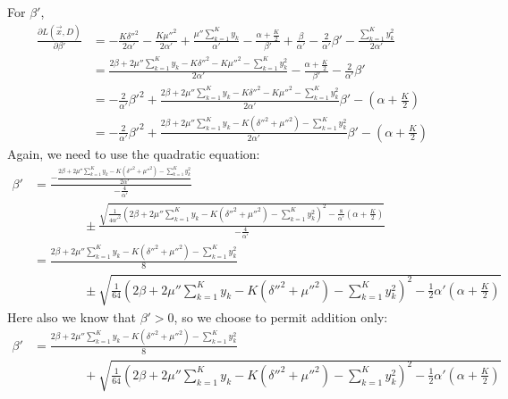 \documentclass[12pt]{article}
\begin{document}
\begin{appendices}
For $\beta'$,
\begin{align}
    \frac{\partial L(\vec{x}, D)}{\partial \beta'} &=
    - \frac{K\delta''^2}{2\alpha'} - \frac{K\mu''^2}{2\alpha'}
    + \frac{\mu''\sum_{k=1}^{K}y_{k}}{\alpha'}
    - \frac{\alpha + \frac{K}{2}}{\beta'}
    + \frac{\beta}{\alpha'} - \frac{2}{\alpha'}\beta'
    - \frac{\sum_{k=1}^{K} y_{k}^2}{2\alpha'}
    \nonumber \\
    &= \frac{2\beta + 2\mu''\sum_{k=1}^{K}y_{k}
    - K\delta''^2 - K\mu''^2
    - \sum_{k=1}^{K} y_{k}^2}{2\alpha'}
    - \frac{\alpha + \frac{K}{2}}{\beta'}
    - \frac{2}{\alpha'}\beta'
    \nonumber \\
    &=
    - \frac{2}{\alpha'}\beta'^2
    + \frac{2\beta + 2\mu''\sum_{k=1}^{K}y_{k}
    - K\delta''^2 - K\mu''^2
    - \sum_{k=1}^{K} y_{k}^2}{2\alpha'}\beta'
    - (\alpha + \frac{K}{2})
    \nonumber \\
    &=
    - \frac{2}{\alpha'}\beta'^2
    + \frac{2\beta + 2\mu''\sum_{k=1}^{K}y_{k}
    - K(\delta''^2 + \mu''^2)
    - \sum_{k=1}^{K} y_{k}^2}{2\alpha'}\beta'
    - (\alpha + \frac{K}{2})
    \nonumber
\end{align}
Again, we need to use the quadratic equation:
\begin{align}
    \beta' &= \frac{- \frac{2\beta + 2\mu''\sum_{k=1}^{K}y_{k} - K(\delta''^2 +
    \mu''^2) - \sum_{k=1}^{K} y_{k}^{2}}{2\alpha'}}{-\frac{4}{\alpha'}}
    \nonumber \\
    &\quad\quad\quad\quad
    \pm
    \frac{\sqrt{\frac{1}{4\alpha'^2}(2\beta + 2\mu''\sum_{k=1}^{K}y_{k} - K(\delta''^2 +
    \mu''^2) - \sum_{k=1}^{K} y_{k}^{2})^2 - \frac{8}{\alpha'}(\alpha +
    \frac{K}{2})}}
    {-\frac{4}{\alpha'}}
    \nonumber \\
    &= \frac{2\beta + 2\mu''\sum_{k=1}^{K}y_{k} - K(\delta''^2 +
    \mu''^2) - \sum_{k=1}^{K} y_{k}^{2}}{8}
    \nonumber \\
    &\quad\quad\quad\quad
    \pm
    \sqrt{\frac{1}{64}(2\beta + 2\mu''\sum_{k=1}^{K}y_{k} - K(\delta''^2 +
    \mu''^2) - \sum_{k=1}^{K} y_{k}^{2})^2 - \frac{1}{2}\alpha'(\alpha +
    \frac{K}{2})}
    \nonumber
\end{align}
Here also we know that $\beta' > 0$, so we choose to permit addition only:
\begin{align}
    \beta' &= \frac{2\beta + 2\mu''\sum_{k=1}^{K}y_{k} - K(\delta''^2 +
    \mu''^2) - \sum_{k=1}^{K} y_{k}^{2}}{8}
    \nonumber \\
    &\quad\quad\quad\quad
    +
    \sqrt{\frac{1}{64}(2\beta + 2\mu''\sum_{k=1}^{K}y_{k} - K(\delta''^2 +
    \mu''^2) - \sum_{k=1}^{K} y_{k}^{2})^2 - \frac{1}{2}\alpha'(\alpha +
    \frac{K}{2})}
    \nonumber
\end{align}
\end{appendices}
\fi

\printbibliography
\end{document}
